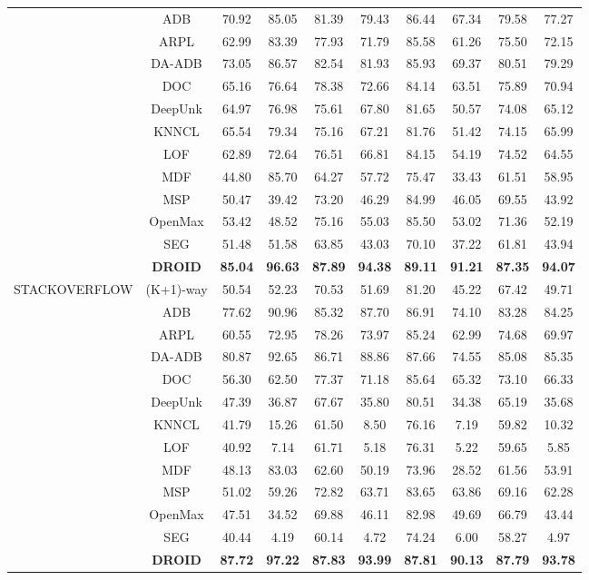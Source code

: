 \documentclass[journal,letterpaper]{IEEEtran}
\begin{document}
\begin{table}[!ht]
\begin{tabular}{c c cc cc cc cc}
& ADB & 70.92 & 85.05 & 81.39 & 79.43 & 86.44 & 67.34 & 79.58 & 77.27 \\
& ARPL & 62.99 & 83.39 & 77.93 & 71.79 & 85.58 & 61.26 & 75.50 & 72.15 \\
& DA-ADB & 73.05 & 86.57 & 82.54 & 81.93 & 85.93 & 69.37 & 80.51 & 79.29 \\
& DOC & 65.16 & 76.64 & 78.38 & 72.66 & 84.14 & 63.51 & 75.89 & 70.94 \\
& DeepUnk & 64.97 & 76.98 & 75.61 & 67.80 & 81.65 & 50.57 & 74.08 & 65.12 \\
& KNNCL & 65.54 & 79.34 & 75.16 & 67.21 & 81.76 & 51.42 & 74.15 & 65.99 \\
& LOF & 62.89 & 72.64 & 76.51 & 66.81 & 84.15 & 54.19 & 74.52 & 64.55 \\
& MDF & 44.80 & 85.70 & 64.27 & 57.72 & 75.47 & 33.43 & 61.51 & 58.95 \\
& MSP & 50.47 & 39.42 & 73.20 & 46.29 & 84.99 & 46.05 & 69.55 & 43.92 \\
& OpenMax & 53.42 & 48.52 & 75.16 & 55.03 & 85.50 & 53.02 & 71.36 & 52.19 \\
& SEG & 51.48 & 51.58 & 63.85 & 43.03 & 70.10 & 37.22 & 61.81 & 43.94 \\
\cmidrule{2-10}
& \textbf{DROID} & \textbf{85.04} & \textbf{96.63} & \textbf{87.89} & \textbf{94.38} & \textbf{89.11} & \textbf{91.21} & \textbf{87.35} & \textbf{94.07} \\
\midrule
\multirow{13}{*}{STACKOVERFLOW}
& (K+1)-way & 50.54 & 52.23 & 70.53 & 51.69 & 81.20 & 45.22 & 67.42 & 49.71 \\
& ADB & 77.62 & 90.96 & 85.32 & 87.70 & 86.91 & 74.10 & 83.28 & 84.25 \\
& ARPL & 60.55 & 72.95 & 78.26 & 73.97 & 85.24 & 62.99 & 74.68 & 69.97 \\
& DA-ADB & 80.87 & 92.65 & 86.71 & 88.86 & 87.66 & 74.55 & 85.08 & 85.35 \\
& DOC & 56.30 & 62.50 & 77.37 & 71.18 & 85.64 & 65.32 & 73.10 & 66.33 \\
& DeepUnk & 47.39 & 36.87 & 67.67 & 35.80 & 80.51 & 34.38 & 65.19 & 35.68 \\
& KNNCL & 41.79 & 15.26 & 61.50 & 8.50 & 76.16 & 7.19 & 59.82 & 10.32 \\
& LOF & 40.92 & 7.14 & 61.71 & 5.18 & 76.31 & 5.22 & 59.65 & 5.85 \\
& MDF & 48.13 & 83.03 & 62.60 & 50.19 & 73.96 & 28.52 & 61.56 & 53.91 \\
& MSP & 51.02 & 59.26 & 72.82 & 63.71 & 83.65 & 63.86 & 69.16 & 62.28 \\
& OpenMax & 47.51 & 34.52 & 69.88 & 46.11 & 82.98 & 49.69 & 66.79 & 43.44 \\
& SEG & 40.44 & 4.19 & 60.14 & 4.72 & 74.24 & 6.00 & 58.27 & 4.97 \\
\cmidrule{2-10}
& \textbf{DROID} & \textbf{87.72} & \textbf{97.22} & \textbf{87.83} & \textbf{93.99} & \textbf{87.81} & \textbf{90.13} & \textbf{87.79} & \textbf{93.78} \\
\bottomrule
\end{tabular}
\end{table}
\end{document}
